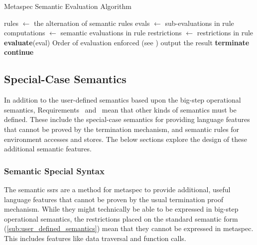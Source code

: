 \begin{breakablealgorithm}
\caption{Metaspec Semantic Evaluation Algorithm}
\label{alg:metaspec_semantic_evaluation_algorithm}
\begin{algorithmic}
\State rules $\gets$ the alternation of semantic rules
\State
{}
    \State evals $\gets$ sub-evaluations in rule
    \State computations $\gets$ semantic evaluations in rule
    \State restrictions $\gets$ restrictions in rule
    \State 
        \State \textbf{evaluate}(eval)
    \EndFor
    \State
            \State {}
            \Comment Order of evaluation enforced (see )
        \EndFor
        \State
        \State output the result
        \State \textbf{terminate}
    \Else
        \State \textbf{continue}
    \EndIf
\EndFor
\end{algorithmic}
\end{breakablealgorithm}



\subsection{Special-Case Semantics} %
\label{sub:special_case_semantics}
In addition to the user-defined semantics based upon the big-step operational semantics, Requirements~ and~ mean that other kinds of semantics must be defined.
These include the special-case semantics for providing language features that cannot be proved by the termination mechanism, and semantic rules for environment accesses and stores.
The below sections explore the design of these additional semantic features.

\subsubsection{Semantic Special Syntax} %
\label{ssub:semantic_special_syntax}
The semantic \glspl{ssr} are a method for \gls{metaspec} to provide additional, useful language features that cannot be proven by the usual termination proof mechanism. 
While they might technically be able to be expressed in big-step operational semantics, the restrictions placed on the standard semantic form (\autoref{sub:user_defined_semantics}) mean that they cannot be expressed in metaspec.
This includes features like data traversal and function calls. \\

